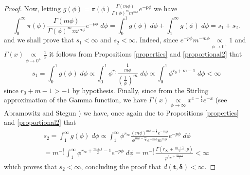 \begin{proof}
Now, letting $g(\phi)=\pi(\phi)\frac{\Gamma(m\phi)}{\Gamma(\phi)^m m^{m \phi}}e^{-p\phi}$ we have
\begin{equation*} \int_{0}^{\infty}\pi(\phi)\frac{\Gamma(m\phi)}{\Gamma(\phi)^m m^{m \phi}}e^{-p\phi}\; d\phi =  \int_{0}^1g(\phi)\; d\phi + \int_1^\infty g(\phi)\; d\phi = s_1+s_2.
\end{equation*}
and we shall prove that $s_1<\infty$ and $s_2<\infty$. Indeed, since
 $e^{-p\phi}m^{-m\phi}\underset{\phi\to 0^+}{\propto}1$ and $\Gamma(x)\underset{\phi\to 0^+}{\propto} \frac{1}{x}$ it follows from Propositions \ref{properties} and \ref{proportional2} that
 \begin{equation*} s_1=\int_{0}^1 g(\phi)\; d\phi \propto \int_0^1 \phi^{r_0}\frac{\frac{1}{m\phi}}{\left(\frac{1}{\phi}\right)^m}\; d\phi \propto \int_0^1 \phi^{r_0+m-1}\; d\phi < \infty
 \end{equation*}
since $r_0+m-1>-1$ by hypothesis. Finally, since from the Stirling approximation of the Gamma function, we have $\Gamma(x)\underset{\phi\to \infty}{\propto} x^{x-\frac{1}{2}}e^{-x}$ (see Abramowitz and Stegun \cite{abramowitz}) we have, once again due to Propositions \ref{properties} and \ref{proportional2} that
\begin{equation*}
\begin{aligned}
s_2 = \int_1^\infty g(\phi)\; d\phi \propto \int_{1}^{\infty}\phi^{r_\infty}\frac{(m\phi)^{m\phi-\frac{1}{2}}e^{-m\phi}}{\phi^{m\phi-\frac{m}{2}}e^{-m\phi} m^{m \phi}}e^{-p\phi}\; d\phi\\ = m^{-\frac{1}{2}} \int_1^\infty \phi^{r_\infty+\frac{m+1}{2}-1}e^{-p\phi}\; d\phi = m^{-\frac{1}{2}}\frac{\Gamma\left(r_\infty+\frac{m+1}{2},p\right)}{p^{r_\infty+\frac{m+1}{2}}}<\infty
\end{aligned}
\end{equation*}
which proves that $s_2<\infty$, concluding the proof that $d(\boldsymbol{t,\delta})<\infty$.
\end{proof}








